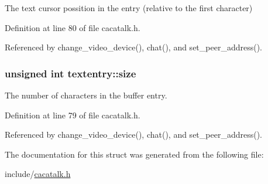\-The text cursor possition in the entry (relative to the first character) 



\-Definition at line 80 of file cacatalk.\-h.



\-Referenced by change\-\_\-video\-\_\-device(), chat(), and set\-\_\-peer\-\_\-address().

\hypertarget{structtextentry_a56e0baee961740d8bd5e0974e94af85a}{
\subsubsection[{size}]{\setlength{\rightskip}{0pt plus 5cm}unsigned int {\bf textentry\-::size}}}\label{structtextentry_a56e0baee961740d8bd5e0974e94af85a}


\-The number of characters in the buffer entry. 



\-Definition at line 79 of file cacatalk.\-h.



\-Referenced by change\-\_\-video\-\_\-device(), chat(), and set\-\_\-peer\-\_\-address().



\-The documentation for this struct was generated from the following file\-:\begin{DoxyCompactItemize}
\item 
include/\hyperlink{cacatalk_8h}{cacatalk.\-h}\end{DoxyCompactItemize}
